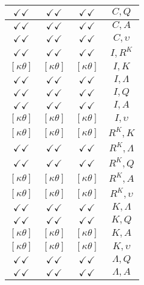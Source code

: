 \documentclass[a4paper,10pt]{article}
\begin{document}
\begin{longtable}{|c|c|c|c|}
\hline
$\checkmark\checkmark$ & $\checkmark\checkmark$ & $\checkmark\checkmark$ & ${C},{Q}$ \\
\hline
$\checkmark\checkmark$ & $\checkmark\checkmark$ & $\checkmark\checkmark$ & ${C},{A}$ \\
\hline
$\checkmark\checkmark$ & $\checkmark\checkmark$ & $\checkmark\checkmark$ & ${C},{\upsilon}$ \\
\hline
$\checkmark\checkmark$ & $\checkmark\checkmark$ & $\checkmark\checkmark$ & ${I},{R^{K}}$ \\
\hline
$[\kappa \theta ]$ & $[\kappa \theta ]$ & $[\kappa \theta ]$ & ${I},{K}$ \\
\hline
$\checkmark\checkmark$ & $\checkmark\checkmark$ & $\checkmark\checkmark$ & ${I},{\Lambda}$ \\
\hline
$\checkmark\checkmark$ & $\checkmark\checkmark$ & $\checkmark\checkmark$ & ${I},{Q}$ \\
\hline
$\checkmark\checkmark$ & $\checkmark\checkmark$ & $\checkmark\checkmark$ & ${I},{A}$ \\
\hline
$[\kappa \theta ]$ & $[\kappa \theta ]$ & $[\kappa \theta ]$ & ${I},{\upsilon}$ \\
\hline
$[\kappa \theta ]$ & $[\kappa \theta ]$ & $[\kappa \theta ]$ & ${R^{K}},{K}$ \\
\hline
$\checkmark\checkmark$ & $\checkmark\checkmark$ & $\checkmark\checkmark$ & ${R^{K}},{\Lambda}$ \\
\hline
$\checkmark\checkmark$ & $\checkmark\checkmark$ & $\checkmark\checkmark$ & ${R^{K}},{Q}$ \\
\hline
$[\kappa \theta ]$ & $[\kappa \theta ]$ & $[\kappa \theta ]$ & ${R^{K}},{A}$ \\
\hline
$[\kappa \theta ]$ & $[\kappa \theta ]$ & $[\kappa \theta ]$ & ${R^{K}},{\upsilon}$ \\
\hline
$\checkmark\checkmark$ & $\checkmark\checkmark$ & $\checkmark\checkmark$ & ${K},{\Lambda}$ \\
\hline
$\checkmark\checkmark$ & $\checkmark\checkmark$ & $\checkmark\checkmark$ & ${K},{Q}$ \\
\hline
$[\kappa \theta ]$ & $[\kappa \theta ]$ & $[\kappa \theta ]$ & ${K},{A}$ \\
\hline
$[\kappa \theta ]$ & $[\kappa \theta ]$ & $[\kappa \theta ]$ & ${K},{\upsilon}$ \\
\hline
$\checkmark\checkmark$ & $\checkmark\checkmark$ & $\checkmark\checkmark$ & ${\Lambda},{Q}$ \\
\hline
$\checkmark\checkmark$ & $\checkmark\checkmark$ & $\checkmark\checkmark$ & ${\Lambda},{A}$ \\

\end{longtable}
\end{document}
